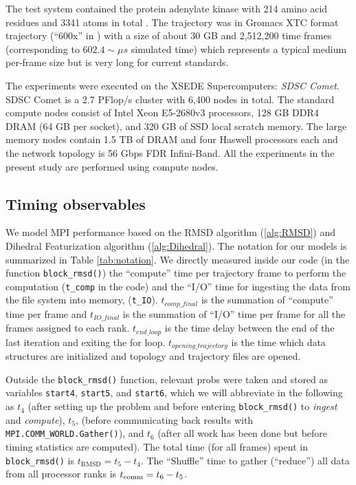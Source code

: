 \label{methods}
The test system contained the protein adenylate kinase with 214 amino acid residues and 3341 atoms in total \cite{Seyler:2014il}. 
The trajectory was in Gromacs XTC format trajectory (``600x'' in \citet{Khoshlessan:2017ab}) with a size of about 30 GB and 2,512,200
time frames (corresponding to $602.4 \sim \mu s$ simulated time) which represents a typical medium per-frame size but is very long for
current standards.

The experiments were executed on the XSEDE Supercomputers: \emph{SDSC Comet}. 
SDSC Comet is a 2.7 PFlop/s cluster with 6,400 nodes in total.
The standard compute nodes consist of Intel Xeon E5-2680v3 processors, 128 GB DDR4 DRAM (64 GB per socket), and 320 GB of SSD local scratch memory. 
The large memory nodes contain 1.5 TB of DRAM and four Haswell processors each and the network topology is 56 Gbps FDR Infini-Band.
All the experiments in the present study are performed using compute nodes.

\subsection{Timing observables}
We model MPI performance based on the RMSD algorithm (\ref{alg:RMSD}) and Dihedral Featurization algorithm (\ref{alg:Dihedral}). 
The notation for our models is summarized in Table \ref{tab:notation}.
We directly measured inside our code (in the function \texttt{block\_rmsd()}) the ``compute'' time per
trajectory frame to perform the computation (\texttt{t\_comp} in the code) and the ``I/O'' time for
ingesting the data from the file system into memory, (\texttt{t\_IO}). 
$t_{comp\_final}$ is the summation of ``compute'' time per frame and $t_{IO\_final}$ is the summation of ``I/O'' time per frame for all the frames assigned to each rank. 
$t_{end\_loop}$ is the time delay between the end of the last iteration and exiting the for loop.
$t_{opening\_trajectory}$ is the time which data structures are initialized and topology and trajectory files are opened.

Outside the \texttt{block\_rmsd()} function, relevant probs were taken and stored as variables \texttt{start4},
\texttt{start5}, and \texttt{start6}, which we will abbreviate in the following as $t_{4}$ (after setting up the problem
and before entering \texttt{block\_rmsd()} to \emph{ingest} and \emph{compute}), $ t_{5}$, (before communicating back results with
\texttt{MPI.COMM\_WORLD.Gather()}), and $t_{6}$ (after all work has been done but before timing statistics are computed).  
The total time (for all frames) spent in \texttt{block\_rmsd()} is $t_{\text{RMSD}} = t_{5} - t_{4}$. 
The ``Shuffle'' time to gather (``reduce'') all data from all processor ranks is $t_{\text{comm}} = t_{6} - t_{5}$.

